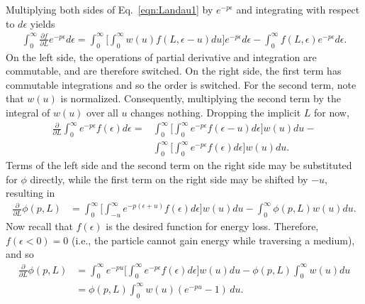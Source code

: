 Multiplying both sides of Eq.~\eqref{eqn:Landau1} by $e^{-p\epsilon}$ and integrating with respect to $d\epsilon$ yields
\begin{align*}
\int_0 ^\infty \frac{\partial f}{\partial L} e^{-p\epsilon} d\epsilon = \int_0 ^\infty \Bigg [\int_0 ^\infty w(u) f(L,\epsilon-u) du \Bigg]e^{-p\epsilon} d\epsilon -  \int_0 ^\infty f(L,\epsilon) e^{-p\epsilon} d\epsilon.
\end{align*}
On the left side, the operations of partial derivative and integration are commutable, and are therefore switched. On the right side, the first term has commutable integrations and so the order is switched. For the second term, note that $w(u)$ is normalized. Consequently, multiplying the second term by the integral of $w(u)$ over all $u$ changes nothing. Dropping the implicit $L$ for now,
\begin{align*}
\frac{\partial}{\partial L}\int_0 ^\infty e^{-p\epsilon} f(\epsilon) d\epsilon = &\int_0 ^\infty \Bigg[\int_0 ^\infty e^{-p\epsilon} f(\epsilon-u)  d\epsilon \Bigg] w(u) du -\\
 & \int_0 ^\infty \Bigg[\int_0 ^\infty e^{-p\epsilon}f(\epsilon) d\epsilon \Bigg] w(u) du.
\end{align*}
Terms of the left side and the second term on the right side may be substituted for $\phi$ directly, while the first term on the right side may be shifted by $-u$, resulting in
\begin{align*}
\frac{\partial}{\partial L} \phi(p,L) &= \int_0 ^\infty \Bigg[\int_{-u} ^\infty e^{-p(\epsilon+u)} f(\epsilon)  d\epsilon \Bigg] w(u) du -\int_0 ^\infty \phi(p,L) w(u) du.
\end{align*}
Now recall that $f(\epsilon)$ is the desired function for energy loss. Therefore, $f(\epsilon<0)=0$ (i.e., the particle cannot gain energy while traversing a medium), and so
\begin{align}
\frac{\partial}{\partial L} \phi(p,L) &= \int_0 ^\infty e^{-pu}\Bigg[\int_{0} ^\infty e^{-p\epsilon} f(\epsilon)  d\epsilon \Bigg] w(u) du -\phi(p,L) \int_0 ^\infty w(u) du\nonumber\\
&=\phi(p,L)\int_0 ^\infty w(u)(e^{-pu}-1)\, du. \nonumber%
\end{align}

